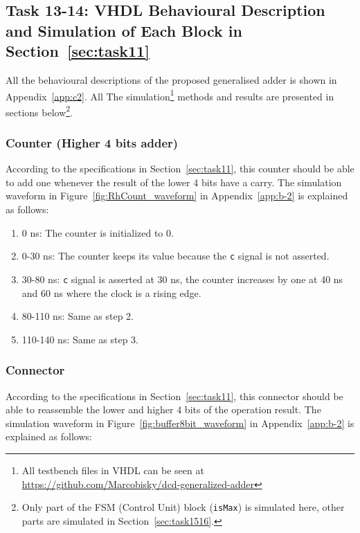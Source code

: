 \documentclass[11pt]{article}
\begin{document}
\subsection{Task 13-14: VHDL Behavioural Description and Simulation of Each Block in Section~\ref{sec:task11}}

All the behavioural descriptions of the proposed generalised adder is shown in Appendix~\ref{app:c2}. All  The simulation\footnote{All testbench files in VHDL can be seen at \url{https://github.com/Marcobisky/dcd-generalized-adder}} methods and results are presented in sections below\footnote{Only part of the FSM (Control Unit) block (\texttt{isMax}) is simulated here, other parts are simulated in Section~\ref{sec:task1516}.}.

\subsubsection{Counter (Higher 4 bits adder)}

According to the specifications in Section~\ref{sec:task11}, this counter should be able to add one whenever the result of the lower 4 bits have a carry. The simulation waveform in Figure~\ref{fig:RhCount_waveform} in Appendix~\ref{app:b-2} is explained as follows:

\begin{enumerate}
	\item 0 ns: The counter is initialized to 0.
	\item 0-30 ns: The counter keeps its value because the \texttt{c} signal is not asserted.
	\item 30-80 ns: \texttt{c} signal is asserted at 30 ns, the counter increases by one at 40 ns and 60 ns where the clock is a rising edge.
	\item 80-110 ns: Same as step 2.
	\item 110-140 ns: Same as step 3.
\end{enumerate}

\subsubsection{Connector}

According to the specifications in Section~\ref{sec:task11}, this connector should be able to reassemble the lower and higher 4 bits of the operation result. The simulation waveform in Figure~\ref{fig:buffer8bit_waveform} in Appendix~\ref{app:b-2} is explained as follows:
\end{document}
